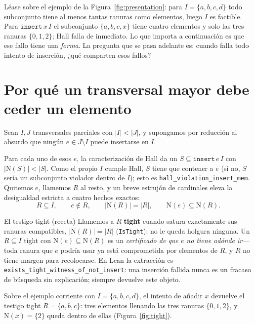 \documentclass[11pt]{article}
\newcommand{\lean}[1]{\texttt{#1}}
\newcommand{\N}{\mathrm{N}}
\begin{document}
Léase sobre el ejemplo de la Figura~\ref{fig:presentation}: para $I=\{a,b,c,d\}$ todo subconjunto
tiene al menos tantas ranuras como elementos, luego $I$ es factible. Para $\lean{insert}\,x\,I$ el
subconjunto $\{a,b,c,x\}$ tiene cuatro elementos y solo las tres ranuras $\{0,1,2\}$; Hall falla de
inmediato. Lo que importa a continuación es que ese fallo tiene una \emph{forma}. La pregunta que
se pasa adelante es: cuando falla todo intento de inserción, ¿qué comparten esos fallos?

\section{Por qué un transversal mayor debe ceder un elemento}\label{sec:q2}

Sean $I,J$ transversales parciales con $|I|<|J|$, y supongamos por reducción al absurdo que ningún
$e\in J\setminus I$ puede insertarse en $I$.

Para cada uno de esos $e$, la caracterización de Hall da un $S\subseteq \lean{insert}\,e\,I$ con
$|\N(S)|<|S|$. Como el propio $I$ cumple Hall, $S$ tiene que contener a $e$ (si no, $S$ sería un
subconjunto violador dentro de $I$); esto es \lean{hall\_violation\_insert\_mem}. Quitemos $e$,
llamemos $R$ al resto, y un breve estrujón de cardinales eleva la desigualdad estricta a cuatro
hechos exactos:
\[
  R\subseteq I,\qquad e\notin R,\qquad |\N(R)|=|R|,\qquad \N(e)\subseteq \N(R).
\]

\begin{recipebox}{El testigo tight (receta)}
Llamemos a $R$ \textbf{tight} cuando satura exactamente sus ranuras compatibles, $|\N(R)|=|R|$
(\lean{IsTight}): no le queda holgura ninguna. Un $R\subseteq I$ tight con $\N(e)\subseteq\N(R)$ es
un \emph{certificado de que $e$ no tiene adónde ir}---toda ranura que $e$ podría usar ya está
comprometida por elementos de $R$, y $R$ no tiene margen para recolocarse. En Lean la extracción es
\lean{exists\_tight\_witness\_of\_not\_insert}: una inserción fallida nunca es un fracaso de
búsqueda sin explicación; siempre devuelve este objeto.
\end{recipebox}

Sobre el ejemplo corriente con $I=\{a,b,c,d\}$, el intento de añadir $x$ devuelve el testigo tight
$R=\{a,b,c\}$: tres elementos llenando las tres ranuras $\{0,1,2\}$, y $\N(x)=\{2\}$ queda dentro
de ellas (Figura~\ref{fig:tight}).
\end{document}
